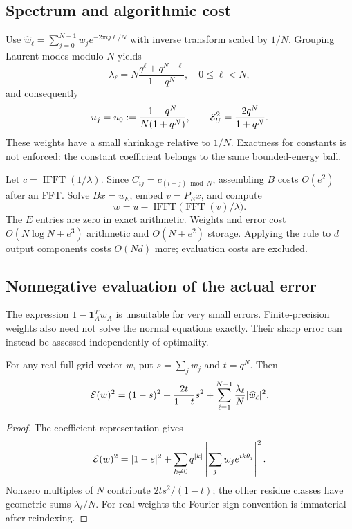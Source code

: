 \documentclass[final,leqno,letterpaper]{etna}
\newcommand{\one}{\boldsymbol 1}\newcommand{\norm}[1]{\left\lVert#1\right\rVert}
\begin{document}
\subsection{Spectrum and algorithmic cost}
Use $\widehat w_\ell=\sum_{j=0}^{N-1}w_je^{-2\pi i j\ell/N}$ with inverse transform scaled by $1/N$. Grouping Laurent modes modulo $N$ yields
\begin{equation}
\lambda_\ell=N\frac{q^\ell+q^{N-\ell}}{1-q^N},\quad 0\le\ell<N,
\label{eq:eigenvalues}
\end{equation}
and consequently
\begin{equation*}
u_j=u_0:=\frac{1-q^N}{N(1+q^N)},\qquad
\mathcal E_U^2=\frac{2q^N}{1+q^N}.
\end{equation*}
These weights have a small shrinkage relative to $1/N$. Exactness for constants is not enforced: the constant coefficient belongs to the same bounded-energy ball.

Let $c=\operatorname{IFFT}(1/\lambda)$. Since $C_{ij}=c_{(i-j)\bmod N}$, assembling $B$ costs $O(e^2)$ after an FFT. Solve $Bx=u_E$, embed $v=P_Ex$, and compute
\begin{equation}
w=u-\operatorname{IFFT}\big(\operatorname{FFT}(v)/\lambda\big).
\label{eq:fft}
\end{equation}
The $E$ entries are zero in exact arithmetic. Weights and error cost $O(N\log N+e^3)$ arithmetic and $O(N+e^2)$ storage. Applying the rule to $d$ output components costs $O(Nd)$ more; evaluation costs are excluded.

\FloatBarrier
\subsection{Nonnegative evaluation of the actual error}
The expression $1-\one_A^Tw_A$ is unsuitable for very small errors. Finite-precision weights also need not solve the normal equations exactly. Their sharp error can instead be assessed independently of optimality.
\begin{proposition}\label{prop:alias}
For any real full-grid vector $w$, put $s=\sum_jw_j$ and $t=q^N$. Then
\begin{equation}
\mathcal E(w)^2=(1-s)^2+\frac{2t}{1-t}s^2+
\sum_{\ell=1}^{N-1}\frac{\lambda_\ell}{N}|\widehat w_\ell|^2.
\label{eq:alias}
\end{equation}
\end{proposition}
\begin{proof}
The coefficient representation gives
\[
\mathcal E(w)^2=|1-s|^2+\sum_{k\ne0}q^{|k|}
\left|\sum_jw_je^{ik\theta_j}\right|^2.
\]
Nonzero multiples of $N$ contribute $2ts^2/(1-t)$; the other residue classes have geometric sums $\lambda_\ell/N$. For real weights the Fourier-sign convention is immaterial after reindexing.
\end{proof}
\end{document}
